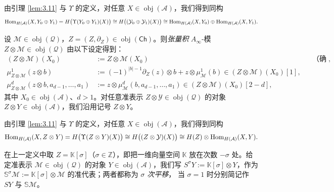 由引理 \ref{lem:3.11} 与 $\Upsilon$ 的定义，对任意
$X\in\operatorname{obj}(\mathcal A)$，我们得到同构
\[
  \operatorname{Hom}_{H(\mathcal A)}(X,Y_0\oplus Y_1)
  =H\bigl(\Upsilon(Y_0\oplus Y_1)(X)\bigr)\cong
  H\bigl((\mathcal Y_0\oplus\mathcal Y_1)(X)\bigr)\cong
  \operatorname{Hom}_{H(\mathcal A)}(X,Y_0)\oplus\operatorname{Hom}_{H(\mathcal A)}(X,Y_1).
\]

\begin{Def}\label{def:3.13}
设 $\mathcal M\in\operatorname{obj}(\mathcal Q)$，$Z=(Z,\partial_Z)\in
\operatorname{obj}(\mathsf{Ch})$。则\emph{张量积} $A_\infty$-模
$Z\otimes\mathcal M\in\operatorname{obj}(\mathcal Q)$ 由以下设定得到：
\[
  \begin{aligned}
    (Z\otimes\mathcal M)(X_0)&:=Z\otimes\mathcal M(X_0)
    &&\text{（确实是分次向量空间）},\\
    \mu^1_{Z\otimes\mathcal M}(z\otimes b)&:=(-1)^{|b|-1}\partial_Z(z)\otimes b
    +z\otimes\mu^1_{\mathcal M}(b)\in(Z\otimes\mathcal M)(X_0)[1],\\
    \mu^d_{Z\otimes\mathcal M}(z\otimes b,a_{d-1},\dots,a_1)&:=
    z\otimes\mu^d_{\mathcal M}(b,a_{d-1},\dots,a_1)\in
    (Z\otimes\mathcal M)(X_0)[2-d],
  \end{aligned}
\]
其中 $X_0\in\operatorname{obj}(\mathcal A)$、$d>1$。对任意准表示
$Z\otimes\mathcal Y\in\operatorname{obj}(\mathcal Q)$ 的对象
$Z\otimes Y\in\operatorname{obj}(\mathcal A)$，我们沿用记号
$Z\otimes Y$。
\end{Def}

由引理 \ref{lem:3.11} 与 $\Upsilon$ 的定义，对任意
$X\in\operatorname{obj}(\mathcal A)$，我们得到同构
\[
  \operatorname{Hom}_{H(\mathcal A)}(X,Z\otimes Y)=H\bigl(\Upsilon(Z\otimes Y)(X)\bigr)
  \cong H\bigl((Z\otimes\mathcal Y)(X)\bigr)\cong H(Z)\otimes
  \operatorname{Hom}_{H(\mathcal A)}(X,Y).
\]

\begin{Def}\label{def:3.14}
在上一定义中取 $Z=\mathbb K[\sigma]$（$\sigma\in\mathbb Z$），即把一维向量空间
$\mathbb K$ 放在次数 $-\sigma$ 处。给定准表示
$\mathcal M\in\operatorname{obj}(\mathcal Q)$ 的对象
$Y\in\operatorname{obj}(\mathcal A)$，我们写 $S^\sigma Y:=
\mathbb K[\sigma]\otimes Y$，作为 $\mathbb S^\sigma\mathcal M:=
\mathbb K[\sigma]\otimes\mathcal M$ 的准代表；两者都称为 \emph{$\sigma$ 次平移}，
当 $\sigma=1$ 时分别简记作 $SY$ 与 $\mathbb S\mathcal M$。
\end{Def}

